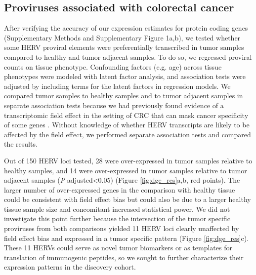 \subsection*{Proviruses associated with colorectal cancer}
After verifying the accuracy of our expression estimates for protein coding genes (Supplementary Methods and Supplementary Figure 1a,b), we tested whether some HERV proviral elements were preferentially transcribed in tumor samples compared to healthy and tumor adjacent samples.
To do so, we regressed proviral counts on tissue phenotype.
Confounding factors (e.g. age) across tissue phenotypes were modeled with latent factor analysis, and association tests were adjusted by including terms for the latent factors in regression models.
We compared tumor samples to healthy samples and to tumor adjacent samples in separate association tests because we had previously found evidence of a transcriptomic field effect in the setting of CRC that can mask cancer specificity of some genes \citep{Dampier2020}.
Without knowledge of whether HERV transcripts are likely to be affected by the field effect, we performed separate association tests and compared the results.

Out of 150 HERV loci tested, 28 were over-expressed in tumor samples relative to healthy samples, and 14 were over-expressed in tumor samples relative to tumor adjacent samples (\emph{P} adjusted<0.05) (Figure \ref{fig:dge_res}a,b, red points).
The larger number of over-expressed genes in the comparison with healthy tissue could be consistent with field effect bias but could also be due to a larger healthy tissue sample size and concomitant increased statistical power.
We did not investigate this point further because the intersection of the tumor specific proviruses from both comparisons yielded 11 HERV loci clearly unaffected by field effect bias and expressed in a tumor specific pattern (Figure \ref{fig:dge_res}c).
These 11 HERVs could serve as novel tumor biomarkers or as templates for translation of immunogenic peptides, so we sought to further characterize their expression patterns in the discovery cohort.

